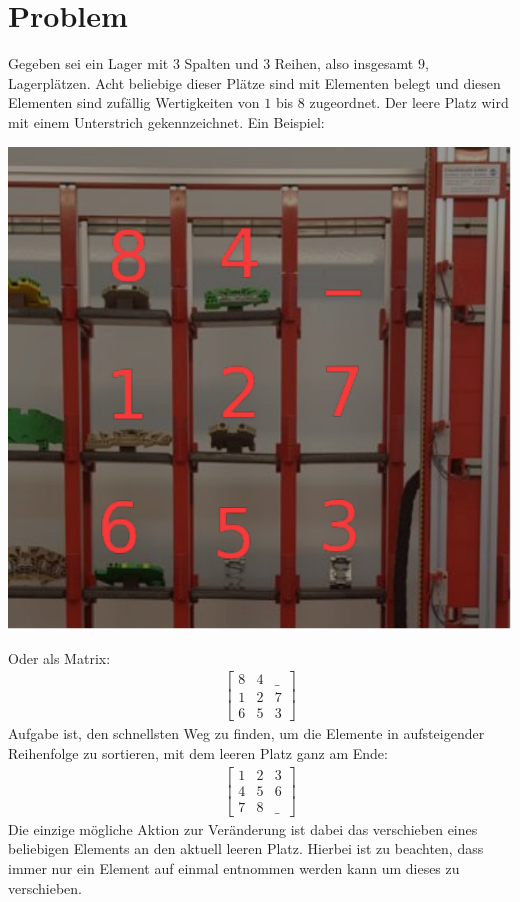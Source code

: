 \documentclass{fh-ium-bama}
\begin{document}
\section{Problem}
Gegeben sei ein Lager mit $3$ Spalten und $3$ Reihen, also insgesamt $9$, Lagerplätzen. Acht beliebige dieser Plätze sind mit Elementen belegt und diesen Elementen sind zufällig Wertigkeiten von $1$ bis $8$ zugeordnet. Der leere Platz wird mit einem Unterstrich gekennzeichnet. Ein Beispiel:
\begin{center}
\includegraphics[scale=0.6]{Perm.pdf}
\end{center}
Oder als Matrix:
\begin{gather*}
\begin{bmatrix}
	8 & 4 & \_ \\
	1 & 2 & 7 \\
	6 & 5 & 3
\end{bmatrix}
\end{gather*}
Aufgabe ist, den schnellsten Weg zu finden, um die Elemente in aufsteigender Reihenfolge zu sortieren, mit dem leeren Platz ganz am Ende:
\begin{gather*}
\begin{bmatrix}
	1 & 2 & 3 \\
	4 & 5 & 6 \\
	7 & 8 & \_
\end{bmatrix}
\end{gather*}
Die einzige mögliche Aktion zur Veränderung ist dabei das verschieben eines beliebigen Elements an den aktuell leeren Platz. Hierbei ist zu beachten, dass immer nur ein Element auf einmal entnommen werden kann um dieses zu verschieben.
\newpage
\end{document}
